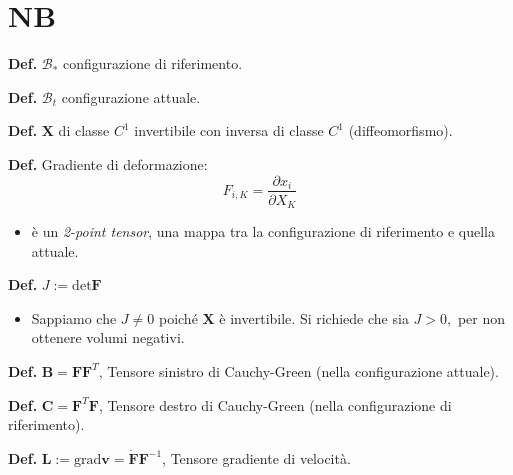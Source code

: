 \documentclass[10pt,a4paper,twoside]{book}
\begin{document}
\section{NB}

\textbf{\textcolor[rgb]{0.82,0.01,0.11}{Def.}} $\mathcal{B}_{*}$ configurazione di riferimento.

\textbf{\textcolor[rgb]{0.82,0.01,0.11}{Def.}} $\mathcal{B}_{t}$ configurazione attuale.

\textbf{\textcolor[rgb]{0.82,0.01,0.11}{Def.}} $\mathbf{X}$ di classe $C^{1}$ invertibile con inversa di classe $C^{1}$ (diffeomorfismo).

\textbf{\textcolor[rgb]{0.82,0.01,0.11}{Def.}} Gradiente di deformazione:
\begin{equation*}
F_{i,K} =\frac{\partial x_{i}}{\partial X_{K}}
\end{equation*}
\begin{itemize}
\item è un \textit{2-point tensor}, una mappa tra la configurazione di riferimento e quella attuale.
\end{itemize}

\textbf{\textcolor[rgb]{0.82,0.01,0.11}{Def.}} $J:=\mathrm{det}\mathbf{F}$
\begin{itemize}
\item Sappiamo che $J\neq 0$ poiché $\mathbf{X}$ è invertibile. Si richiede che sia $J >0,$ per non ottenere volumi negativi.
\end{itemize}

\textbf{\textcolor[rgb]{0.82,0.01,0.11}{Def.}} $\mathbf{B} =\mathbf{FF}^{T}$, Tensore sinistro di Cauchy-Green (nella configurazione attuale).

\textbf{\textcolor[rgb]{0.82,0.01,0.11}{Def.}} $\mathbf{C} =\mathbf{F}^{T}\mathbf{F}$, Tensore destro di Cauchy-Green (nella configurazione di riferimento).

\textbf{\textcolor[rgb]{0.82,0.01,0.11}{Def.}} $\mathbf{L} :=\mathrm{grad}\mathbf{v} =\dot{\mathbf{F}}\mathbf{F}^{-1}$, Tensore gradiente di velocità.
\end{document}

